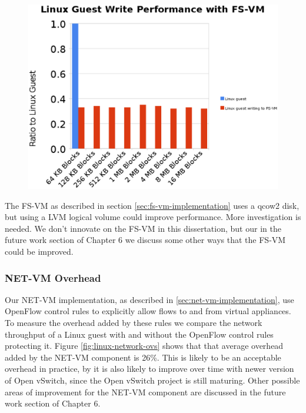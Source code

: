 \begin{figure}[tbp]
\begin{centering}
\label{fig:fs-vm-write}
\includegraphics[scale=.7,angle=90]{figs/fs-vm-write}
\end{centering}
\end{figure}

The FS-VM as described in section \ref{sec:fs-vm-implementation} uses a qcow2 disk, but using a LVM logical volume could improve performance. More investigation is needed. We don't innovate on the FS-VM in this dissertation, but our in the future work section of Chapter 6 we discuss some other ways that the FS-VM could be improved. 

\subsubsection{NET-VM Overhead}

Our NET-VM implementation, as described in \ref{sec:net-vm-implementation}, use OpenFlow control rules to explicitly allow flows to and from virtual appliances. To measure the overhead added by these rules we compare the network throughput of a Linux guest with and without the OpenFlow control rules protecting it. Figure \ref{fig:linux-network-ovs} shows that that average overhead added by the NET-VM component is 26\%. This is likely to be an acceptable overhead in practice, by it is also likely to improve over time with newer version of Open vSwitch, since the Open vSwitch project is still maturing. Other possible areas of improvement for the NET-VM component are discussed in the future work section of Chapter 6.

